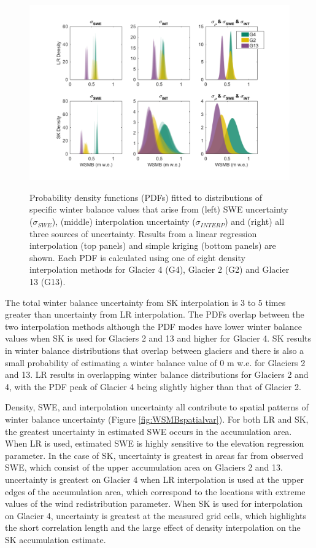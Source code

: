 \documentclass[review,oneside, letterpaper]{igs}
\begin{document}
\begin{figure}
	\centering
\hspace*{-1.2cm}
	\includegraphics[width =1.2\textwidth]{WSMBDist.pdf}\\
	\caption{Probability density functions (PDFs) fitted to distributions of specific winter balance values that arise from (left) SWE uncertainty ($\sigma_{SWE}$), (middle) interpolation uncertainty ($\sigma_{INTERP}$) and (right) all three sources of uncertainty. Results from a linear regression interpolation (top panels) and simple kriging (bottom panels) are shown. Each PDF is calculated using one of eight density interpolation methods for Glacier 4 (G4), Glacier 2 (G2) and Glacier 13 (G13).}
	\label{fig:WSMBDist_LR}
\end{figure}

The total winter balance uncertainty from SK interpolation is 3 to 5 times greater than uncertainty from LR interpolation. The PDFs overlap between the two interpolation methods although the PDF modes have lower winter balance values when SK is used for Glaciers 2 and 13 and higher for Glacier 4. SK results in winter balance distributions that overlap between glaciers and there is also a small probability of estimating a winter balance value of 0 m w.e. for Glaciers 2 and 13. LR results in overlapping winter balance distributions for Glaciers 2 and 4, with the PDF peak of Glacier 4 being slightly higher than that of Glacier 2. 

Density, SWE, and interpolation uncertainty all contribute to spatial patterns of winter balance uncertainty (Figure \ref{fig:WSMBspatialvar}).  For both LR and SK, the greatest uncertainty in estimated SWE occurs in the accumulation area. When LR is used, estimated SWE is highly sensitive to the elevation regression parameter. In the case of SK, uncertainty is greatest in areas far from observed SWE, which consist of the upper accumulation area on Glaciers 2 and 13. uncertainty is greatest on Glacier 4 when LR interpolation is used at the upper edges of the accumulation area, which correspond to the locations with extreme values of the wind redistribution parameter. When SK is used for interpolation on Glacier 4, uncertainty is greatest at the measured grid cells, which highlights the short correlation length and the large effect of density interpolation on the SK accumulation estimate.
\end{document}
